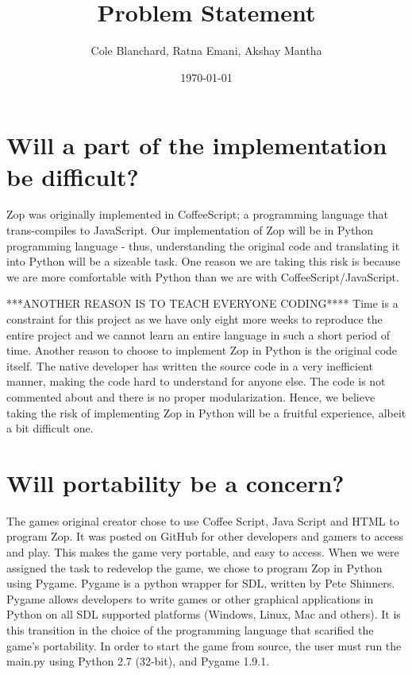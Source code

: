 \documentclass[12pt]{article}
\begin{document}
\title{Problem Statement}
\author{Cole Blanchard,
Ratna Emani, Akshay Mantha}
\date{\today}
\maketitle

\section{Will a part of the implementation be difficult?}
Zop was originally implemented in CoffeeScript; a programming language that trans-compiles to JavaScript. Our implementation of Zop will be in Python programming language - thus, understanding the original code and translating it into Python will be a sizeable task. One reason we are taking this risk is because we are more comfortable with Python than we are with CoffeeScript/JavaScript.

***ANOTHER REASON IS TO TEACH EVERYONE CODING**** Time is a constraint for this project as we have only eight more weeks to reproduce the entire project and we cannot learn an entire language in such a short period of time. Another reason to choose to implement Zop in Python is the original code itself. The native developer has written the source code in a very inefficient manner, making the code hard to understand for anyone else. The code is not commented about and there is no proper modularization. Hence, we believe taking the risk of implementing Zop in Python will be a fruitful experience, albeit a bit difficult one.
\section{Will portability be a concern?}
The games original creator chose to use Coffee Script, Java Script and HTML to program Zop. It was posted on GitHub for other developers and gamers to access and play. This makes the game very portable, and easy to access. When we were assigned the task to redevelop the game, we chose to program Zop in Python using Pygame. Pygame is a python wrapper for SDL, written by Pete Shinners. Pygame allows developers to write games or other graphical applications in Python on all SDL supported platforms (Windows, Linux, Mac and others). It is this transition in the choice of the programming language that scarified the game’s portability. In order to start the game from source, the user must run the main.py using Python 2.7 (32-bit), and Pygame 1.9.1.
\end{document}
